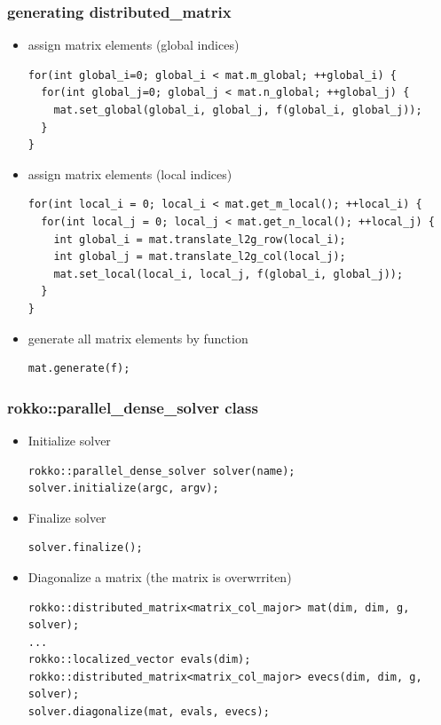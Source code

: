 \begin{frame}[c,fragile]
  \frametitle{generating distributed_matrix}
  \begin{itemize}
  \item assign matrix elements (global indices)
\begin{lstlisting}
for(int global_i=0; global_i < mat.m_global; ++global_i) {
  for(int global_j=0; global_j < mat.n_global; ++global_j) {
    mat.set_global(global_i, global_j, f(global_i, global_j));
  }
}
\end{lstlisting}
  \item assign matrix elements (local indices)
\begin{lstlisting}
for(int local_i = 0; local_i < mat.get_m_local(); ++local_i) {
  for(int local_j = 0; local_j < mat.get_n_local(); ++local_j) {
    int global_i = mat.translate_l2g_row(local_i);
    int global_j = mat.translate_l2g_col(local_j);
    mat.set_local(local_i, local_j, f(global_i, global_j));
  }
}
\end{lstlisting}
  \item generate all matrix elements by function
\begin{lstlisting}
mat.generate(f);
\end{lstlisting}
  \end{itemize}
\end{frame}

\begin{frame}[c,fragile]
  \frametitle{rokko::parallel_dense_solver class}
  \begin{itemize}
  \item Initialize solver
\begin{lstlisting}
rokko::parallel_dense_solver solver(name);
solver.initialize(argc, argv);
\end{lstlisting}
  \item Finalize solver
\begin{lstlisting}
solver.finalize();
\end{lstlisting}
  \item Diagonalize a matrix (the matrix is overwrriten)
\begin{lstlisting}
rokko::distributed_matrix<matrix_col_major> mat(dim, dim, g, solver);
...
rokko::localized_vector evals(dim);
rokko::distributed_matrix<matrix_col_major> evecs(dim, dim, g, solver);
solver.diagonalize(mat, evals, evecs);
\end{lstlisting}
  \end{itemize}
\end{frame}


